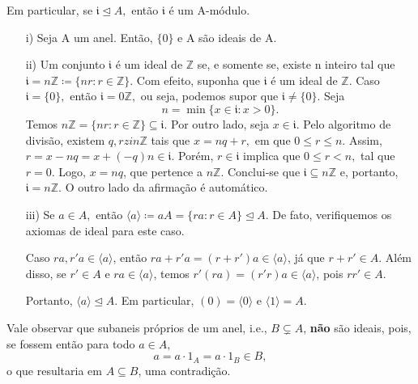 \documentclass[algebraII_notes.tex]{subfiles}
\begin{document}
Em particular, se \(\mathfrak{i} \trianglelefteq{A},\) então \(\mathfrak{i}\) é um A-módulo.
\begin{example}
	\begin{itemize}
		\item[i)] Seja A um anel. Então, \(\{0\}\) e A são ideais de A.
		\item[ii)] Um conjunto \(\mathfrak{i}\) é um ideal de \(\mathbb{Z}\) se, e somente se, existe n inteiro tal que \(\mathfrak{i} = n \mathbb{Z}\coloneqq \{nr:r\in \mathbb{Z}\}\).
		      Com efeito, suponha que \(\mathfrak{i}\) é um ideal de \(\mathbb{Z}.\) Caso \(\mathfrak{i} = \{0\},\) então \(\mathfrak{i} = 0 \mathbb{Z},\) ou seja, podemos supor que \(\mathfrak{i}\neq \{0\}.\) Seja
		      \[
			      n = \min\{x\in \mathfrak{i}: x > 0\}.
		      \]
		      Temos \(n \mathbb{Z} = \{nr:r\in \mathbb{Z}\}\subseteq \mathfrak{i}\). Por outro lado, seja \(x\in \mathfrak{i}.\) Pelo algoritmo de divisão, existem
		      \(q, rzin \mathbb{Z}\) tais que \(x = nq + r,\) em que \( 0 \leq r \leq n\). Assim, \(r = x-nq = x + (-q)n\in \mathfrak{i}\).
		      Porém, \(r\in \mathfrak{i}\) implica que \(0\leq r < n,\) tal que \( r = 0\). Logo,
		      \(x = nq \), que pertence a \(n \mathbb{Z}.\) Conclui-se que \(\mathfrak{i}\subseteq n \mathbb{Z}\) e, portanto, \(\mathfrak{i} = n \mathbb{Z}\). O outro lado da
		      afirmação é automático.
		\item[iii)] Se \(a\in A,\) então \(\langle a \rangle\coloneqq aA = \{ra: r\in A\}\trianglelefteq{A}.\) De fato,
		      verifiquemos os axiomas de ideal para este caso.

		      Caso \(ra, r'a\in \langle a \rangle\), então \(ra + r'a = (r+r')a\in \langle a \rangle\), já que \(r + r'\in A.\)
		      Além disso, se \(r'\in A\) e \(ra\in \langle a \rangle\), temos \(r'(ra) = (r'r)a\in \langle a \rangle\), pois \(rr'\in A.\)

		      Portanto, \(\langle a \rangle \trianglelefteq{A}\). Em particular, \((0) = \langle 0 \rangle\) e \(\langle 1 \rangle = A.\)
	\end{itemize}
\end{example}
Vale observar que subaneis próprios de um anel, i.e., \(B\subsetneq A\), \textbf{não} são ideais, pois, se fossem então para todo \(a\in A,\)
\[
	a = a \cdot 1_{A} = a \cdot 1_{B}\in B,
\]
o que resultaria em \(A\subseteq B\), uma contradição.
\end{document}
